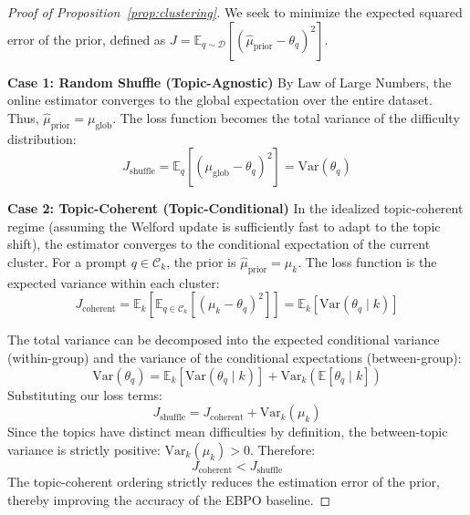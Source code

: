 \documentclass{article}
\theoremstyle{plain}
\theoremstyle{definition}
\theoremstyle{remark}
\begin{document}
\begin{proof}[Proof of Proposition~\ref{prop:clustering}]
We seek to minimize the expected squared error of the prior, defined as $J = \mathbb{E}_{q \sim \mathcal{D}} [(\hat{\mu}_{\text{prior}} - \theta_q)^2]$.

\textbf{Case 1: Random Shuffle (Topic-Agnostic)}
By Law of Large Numbers, the online estimator converges to the global expectation over the entire dataset. Thus, $\hat{\mu}_{\text{prior}} = \mu_{\text{glob}}$. The loss function becomes the total variance of the difficulty distribution:
\begin{equation*}
    J_{\text{shuffle}} = \mathbb{E}_{q} [(\mu_{\text{glob}} - \theta_q)^2] = \text{Var}(\theta_q)
\end{equation*}

\textbf{Case 2: Topic-Coherent (Topic-Conditional)}
In the idealized topic-coherent regime (assuming the Welford update is sufficiently fast to adapt to the topic shift), the estimator converges to the conditional expectation of the current cluster. For a prompt $q \in \mathcal{C}_k$, the prior is $\hat{\mu}_{\text{prior}} = \mu_k$. The loss function is the expected variance within each cluster:
\begin{equation*}
    J_{\text{coherent}} = \mathbb{E}_{k} \left[ \mathbb{E}_{q \in \mathcal{C}_k} [(\mu_k - \theta_q)^2] \right] = \mathbb{E}_k [\text{Var}(\theta_q \mid k)]
\end{equation*}

The total variance can be decomposed into the expected conditional variance (within-group) and the variance of the conditional expectations (between-group):
\begin{equation}
    \text{Var}(\theta_q) = \mathbb{E}_k [\text{Var}(\theta_q \mid k)] + \text{Var}_k (\mathbb{E}[\theta_q \mid k])
\end{equation}
Substituting our loss terms:
\begin{equation}
    J_{\text{shuffle}} = J_{\text{coherent}} + \text{Var}_k(\mu_k)
\end{equation}
Since the topics have distinct mean difficulties by definition, the between-topic variance is strictly positive: $\text{Var}_k(\mu_k) > 0$.
Therefore:
\begin{equation}
    J_{\text{coherent}} < J_{\text{shuffle}}
\end{equation}
The topic-coherent ordering strictly reduces the estimation error of the prior, thereby improving the accuracy of the EBPO baseline.
\end{proof}
\end{document}
